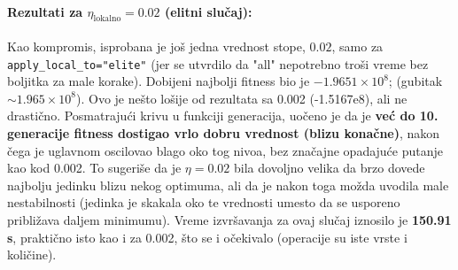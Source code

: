 \documentclass[a4paper,12pt]{article}
\begin{document}
\paragraph{Rezultati za $\eta_{\text{lokalno}} = 0.02$ (elitni slučaj):}
Kao kompromis, isprobana je još jedna vrednost stope, $0.02$, samo za \texttt{apply\_local\_to="elite"} (jer se utvrdilo da "all" nepotrebno troši vreme bez boljitka za male korake). Dobijeni najbolji fitness bio je \boldmath$-1.9651 \times 10^8$\unboldmath; (gubitak $\sim 1.965\times10^8$). Ovo je nešto lošije od rezultata sa 0.002 (-1.5167e8), ali ne drastično. Posmatrajući krivu u funkciji generacija, uočeno je da je \textbf{već do 10. generacije fitness dostigao vrlo dobru vrednost (blizu konačne)}, nakon čega je uglavnom oscilovao blago oko tog nivoa, bez značajne opadajuće putanje kao kod 0.002. To sugeriše da je $\eta=0.02$ bila dovoljno velika da brzo dovede najbolju jedinku blizu nekog optimuma, ali da je nakon toga možda uvodila male nestabilnosti (jedinka je skakala oko te vrednosti umesto da se usporeno približava daljem minimumu). Vreme izvršavanja za ovaj slučaj iznosilo je \textbf{150.91 s}, praktično isto kao i za 0.002, što se i očekivalo (operacije su iste vrste i količine).
\end{document}
